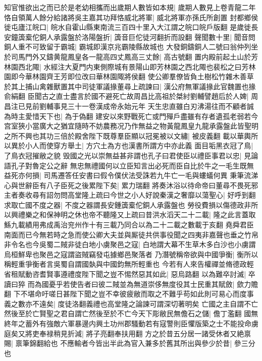 知官惟欲出之而已於是老幼相攜而出歲期人數皆如本規|{
	歲期人數見上卷青龍二年}
恪自領萬人餘分給諸將吳主嘉其功拜恪威北將軍|{
	威北將軍亦孫氏所創置}
封都鄉侯徙屯廬江皖口|{
	皖水自霍山縣東南流三百四十里入大江謂之皖口皖戶版翻}
是歲徙長安鐘簴槖佗銅人承露盤於洛陽盤折|{
	簴音巨佗徒河翻折而設翻}
聲聞數十里|{
	聞音問}
銅人重不可致留于霸城|{
	霸城即漢京兆霸陵縣故城也}
大發銅鑄銅人二號曰翁仲列坐於司馬門外又鑄黄龍鳳皇各一龍高四丈鳳高三丈餘|{
	高古號翻}
置内殿前起土山於芳林園西北陬|{
	水經注大夏門内東側際城有景陽山即芳林園之西北陬也裴松之曰芳林園即今華林園齊王芳即位改曰華林園陬將侯翻}
使公卿羣僚皆負土樹松竹雜木善草於其上捕山禽雜獸置其中司徒軍議掾董尋上疏諫曰|{
	漢公府無軍議掾此官魏置也掾俞絹翻}
臣聞古之直士盡言於國不避死亡故周昌比高祖於桀紂劉輔譬趙后於人婢|{
	周昌注已見前劉輔事見三十一卷漢成帝永始元年}
天生忠直雖白刃沸湯往而不顧者誠為時主愛惜天下也|{
	為于偽翻}
建安以來野戰死亡或門殫戶盡雖有存者遺孤老弱若今宫室狹小當廣大之猶宜隨時不妨農務况乃作無益之物黃龍鳳皇九龍承露盤此皆聖明之所不興也其功三倍於殿舍陛下既尊羣臣顯以冠冕被以文繡|{
	被皮義翻}
載以華輿所以異於小人而使穿方舉土|{
	方穴土為方也漢書所謂方中亦此義}
面目垢黑衣冠了鳥|{
	了鳥衣冠摧敝之貌}
毁國之光以崇無益甚非謂也孔子曰君使臣以禮臣事君以忠|{
	見論語孔子對魯定公之辭}
無忠無禮國何以立臣知言出必死而臣自比於牛之一毛生既無益死亦何損|{
	司馬遷答任安書曰假令僕伏法受誅若九牛亡一毛與螻蟻何異}
秉筆流涕心與世辭臣有八子臣死之後累陛下矣|{
	累力瑞翻}
將奏沐浴以待命帝曰董尋不畏死邪主者奏收尋有詔勿問高堂隆上疏曰今世之小人好說秦漢之奢靡以蕩聖心|{
	好呼到翻}
求取亡國不度之器|{
	不度之器謂長安鍾簴槖佗銅人承露盤也}
勞役費損以傷德政非所以興禮樂之和保神明之休也帝不聽隆又上疏曰昔洪水滔天二十二載|{
	隆之此言蓋取鯀九載績用弗成禹治兖州作十有三載乃同合以為二十二載之數載于亥翻}
堯舜君臣南面而已今無若時之急而使公卿大夫並與厮徒共供事役聞之四夷非嘉聲也垂之竹帛非令名也今吳蜀二賊非徒白地小虜聚邑之寇|{
	白地謂大幕不生草木多白沙也小虜謂烏桓鮮卑也聚邑之寇謂盜賊竊發屯據鄉邑聚落者}
乃潛號稱帝欲與中國爭衡|{
	衡所以稱輕重爭衡者言吳蜀自謂國埶與中國鈞無所輕重也}
今若有人來告權禪並脩德政輕省租賦動咨耆賢事遵禮度陛下聞之豈不惕然惡其如此|{
	惡烏路翻}
以為難卒討滅|{
	卒讀曰猝}
而為國憂乎若使告者曰彼二賊並為無道崇侈無度役其士民重其賦斂|{
	歛力贍翻}
下不堪命吁嗟日甚陛下聞之豈不幸彼疲敝而取之不難乎苟如此則可易心而度事義之數亦不遠矣|{
	度徒洛翻義禮也高堂隆之論諫可謂深切著明矣}
亡國之主自謂不亡然後至於亡賢聖之君自謂亡然後至於不亡今天下彫敝民無儋石之儲|{
	儋丁濫翻}
國無終年之蓄外有強敵六軍暴邊内興土功州郡騷動若有寇警則臣懼版築之士不能投命虜庭矣又將吏奉禄稍見折減|{
	將子亮翻奉扶用翻}
方之於昔五分居一諸受休者又絶禀賜|{
	禀筆錦翻給也}
不應輸者今皆出半此為官入兼多於舊其所出與參少於昔|{
	參三分也}
